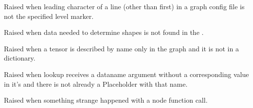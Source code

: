 \documentclass[letterpaper,10pt,english]{sphinxmanual}
\begin{document}

\begin{fulllineitems}
\label{config:config.GraphMarkerError}
Raised when leading character of a line (other than first)
in a graph config file is not the specified level marker.

\end{fulllineitems}


\begin{fulllineitems}
\label{config:config.MissingDataError}
Raised when data needed to determine shapes is not found in the {\hyperref[loader:loader.DataSet]{\emph{}}}.

\end{fulllineitems}


\begin{fulllineitems}
\label{config:config.MissingTensorError}
Raised when a tensor is described by name only in the graph and it is not in a dictionary.

\end{fulllineitems}


\begin{fulllineitems}
\label{config:config.ProcessLookupError}
Raised when lookup receives a dataname argument without a corresponding value in it's {\hyperref[loader:loader.DataSet]{\emph{}}}
and there is not already a Placeholder with that name.

\end{fulllineitems}


\begin{fulllineitems}
\label{config:config.RandomNodeFunctionError}
Raised when something strange happened with a node function call.

\end{fulllineitems}

\end{document}
